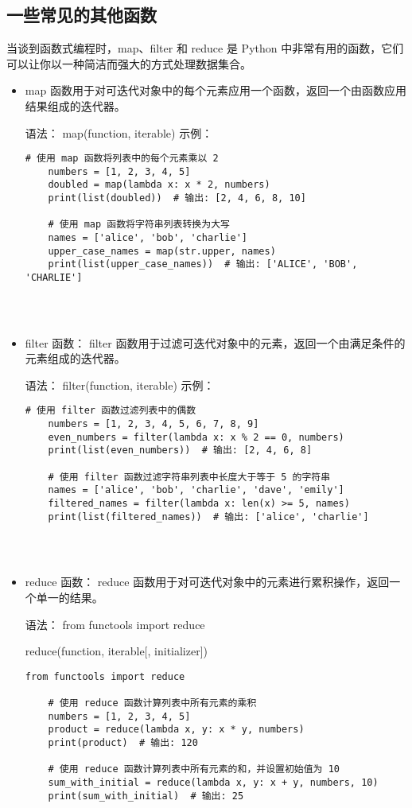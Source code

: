 \documentclass{article}
\begin{document}
\subsection{一些常见的其他函数}
当谈到函数式编程时，map、filter 和 reduce 是 Python 中非常有用的函数，它们可以让你以一种简洁而强大的方式处理数据集合。
\begin{itemize}
   \item  map 函数用于对可迭代对象中的每个元素应用一个函数，返回一个由函数应用结果组成的迭代器。

    语法：
    map(function, iterable)
    示例：
   
\begin{lstlisting}[caption={示例Python代码}]
    # 使用 map 函数将列表中的每个元素乘以 2
    numbers = [1, 2, 3, 4, 5]
    doubled = map(lambda x: x * 2, numbers)
    print(list(doubled))  # 输出: [2, 4, 6, 8, 10]
    
    # 使用 map 函数将字符串列表转换为大写
    names = ['alice', 'bob', 'charlie']
    upper_case_names = map(str.upper, names)
    print(list(upper_case_names))  # 输出: ['ALICE', 'BOB', 'CHARLIE']




\end{lstlisting}
\item filter 函数：
filter 函数用于过滤可迭代对象中的元素，返回一个由满足条件的元素组成的迭代器。

语法：
filter(function, iterable)
示例：


\begin{lstlisting}[caption={示例Python代码}]
    # 使用 filter 函数过滤列表中的偶数
    numbers = [1, 2, 3, 4, 5, 6, 7, 8, 9]
    even_numbers = filter(lambda x: x % 2 == 0, numbers)
    print(list(even_numbers))  # 输出: [2, 4, 6, 8]
    
    # 使用 filter 函数过滤字符串列表中长度大于等于 5 的字符串
    names = ['alice', 'bob', 'charlie', 'dave', 'emily']
    filtered_names = filter(lambda x: len(x) >= 5, names)
    print(list(filtered_names))  # 输出: ['alice', 'charlie']




\end{lstlisting}
\item reduce 函数：
reduce 函数用于对可迭代对象中的元素进行累积操作，返回一个单一的结果。

语法：
from functools import reduce

reduce(function, iterable[, initializer])


\begin{lstlisting}[caption={示例Python代码}]
    from functools import reduce

    # 使用 reduce 函数计算列表中所有元素的乘积
    numbers = [1, 2, 3, 4, 5]
    product = reduce(lambda x, y: x * y, numbers)
    print(product)  # 输出: 120
    
    # 使用 reduce 函数计算列表中所有元素的和，并设置初始值为 10
    sum_with_initial = reduce(lambda x, y: x + y, numbers, 10)
    print(sum_with_initial)  # 输出: 25
\end{lstlisting}
\end{itemize}
\end{document}
